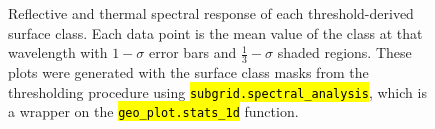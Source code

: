 \documentclass[12pt]{article}
\newcommand{\hltexttt}[1]{\texttt{\hl{#1}}}
\begin{document}
\begin{figure}[h!]
    \centering

    \begin{center}
    \end{center}

    \caption{Reflective and thermal spectral response of each threshold-derived surface class. Each data point is the mean value of the class at that wavelength with $1-\sigma$ error bars and $\frac{1}{3}-\sigma$ shaded regions. These plots were generated with the surface class masks from the thresholding procedure using \hltexttt{subgrid.spectral\_analysis}, which is a wrapper on the \hltexttt{geo\_plot.stats\_1d} function.}
    \label{thresh_spectra}
\end{figure}

\clearpage
\end{document}
